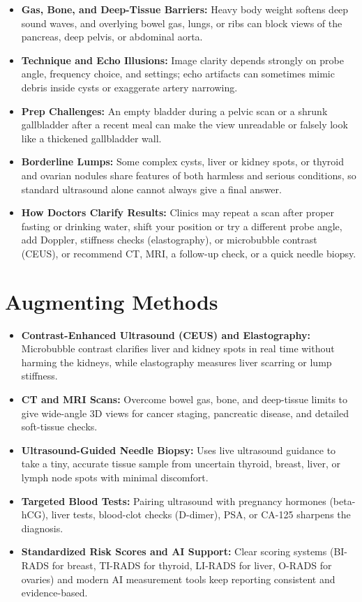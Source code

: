 \begin{itemize}
    \item \textbf{Gas, Bone, and Deep-Tissue Barriers:} Heavy body weight softens deep sound waves, and overlying bowel gas, lungs, or ribs can block views of the pancreas, deep pelvis, or abdominal aorta.
    \item \textbf{Technique and Echo Illusions:} Image clarity depends strongly on probe angle, frequency choice, and settings; echo artifacts can sometimes mimic debris inside cysts or exaggerate artery narrowing.
    \item \textbf{Prep Challenges:} An empty bladder during a pelvic scan or a shrunk gallbladder after a recent meal can make the view unreadable or falsely look like a thickened gallbladder wall.
    \item \textbf{Borderline Lumps:} Some complex cysts, liver or kidney spots, or thyroid and ovarian nodules share features of both harmless and serious conditions, so standard ultrasound alone cannot always give a final answer.
    \item \textbf{How Doctors Clarify Results:} Clinics may repeat a scan after proper fasting or drinking water, shift your position or try a different probe angle, add Doppler, stiffness checks (elastography), or microbubble contrast (CEUS), or recommend CT, MRI, a follow-up check, or a quick needle biopsy.
\end{itemize}

\section{Augmenting Methods}

\begin{itemize}
    \item \textbf{Contrast-Enhanced Ultrasound (CEUS) and Elastography:} Microbubble contrast clarifies liver and kidney spots in real time without harming the kidneys, while elastography measures liver scarring or lump stiffness.
    \item \textbf{CT and MRI Scans:} Overcome bowel gas, bone, and deep-tissue limits to give wide-angle 3D views for cancer staging, pancreatic disease, and detailed soft-tissue checks.
    \item \textbf{Ultrasound-Guided Needle Biopsy:} Uses live ultrasound guidance to take a tiny, accurate tissue sample from uncertain thyroid, breast, liver, or lymph node spots with minimal discomfort.
    \item \textbf{Targeted Blood Tests:} Pairing ultrasound with pregnancy hormones (beta-hCG), liver tests, blood-clot checks (D-dimer), PSA, or CA-125 sharpens the diagnosis.
    \item \textbf{Standardized Risk Scores and AI Support:} Clear scoring systems (BI-RADS for breast, TI-RADS for thyroid, LI-RADS for liver, O-RADS for ovaries) and modern AI measurement tools keep reporting consistent and evidence-based.
\end{itemize}

